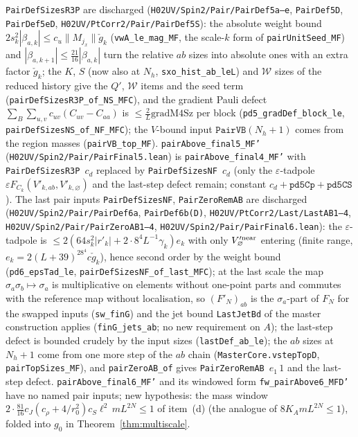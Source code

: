 \documentclass[11pt]{amsart}
\theoremstyle{definition}
\theoremstyle{remark}
\numberwithin{equation}{section}
\begin{document}
\texttt{PairDefSizesR3P} are discharged (\texttt{H02UV/Spin2/Pair/PairDef5a--e}, \texttt{PairDef5D}, \texttt{PairDef5eD}, \texttt{H02UV/PtCorr2/Pair/PairDef5S}): the absolute weight bound $2s_k^2|\beta_{a,k}|\le c_u\|M_{j_x}\|\check g_k$ (\texttt{vwA\_le\_mag\_MF}, the scale-$k$ form of \texttt{pairUnitSeed\_MF}) and $|\beta_{a,k+1}|\le\frac{21}{16}|\beta_{a,k}|$ turn the relative $ab$ sizes into absolute ones with an extra factor $\check g_k$; the $K$, $S$ (now also at $N_h$, \texttt{sxo\_hist\_ab\_leL}) and $\mathcal W$ sizes of the reduced history give the $Q'$, $\mathcal W$ items and the seed term (\texttt{pairDefSizesR3P\_of\_NS\_MFC}), and the gradient Pauli defect $\sum_B\sum_{u,v}c_{uv}(C_{uv}-C_{aa})$ is $\le\frac2L\mathrm{gradM4Sz}$ per block (\texttt{pd5\_gradDef\_block\_le}, \texttt{pairDefSizesNS\_of\_NF\_MFC}); the $V$-bound input $\texttt{PairVB}(N_h+1)$ comes from the region masses (\texttt{pairVB\_top\_MF}). \texttt{pairAbove\_final5\_MF'} (\texttt{H02UV/Spin2/Pair/PairFinal5.lean}) is \texttt{pairAbove\_final4\_MF'} with \texttt{PairDefSizesR3P}~$c_d$ replaced by \texttt{PairDefSizesNF}~$c_d$ (only the $\varepsilon$-tadpole $\varepsilon F_{C_k}(V'_{k,ab},V'_{k,\varnothing})$ and the last-step defect remain; constant $c_d+\texttt{pd5Cp}+\texttt{pd5CS}$). The last pair inputs \texttt{PairDefSizesNF}, \texttt{PairZeroRemAB} are discharged (\texttt{H02UV/Spin2/Pair/PairDef6a}, \texttt{PairDef6b(D)}, \texttt{H02UV/PtCorr2/Last/LastAB1--4}, \texttt{H02UV/Spin2/Pair/PairZeroAB1--4}, \texttt{H02UV/Spin2/Pair/PairFinal6.lean}): the $\varepsilon$-tadpole is $\le2(64s_k^2|r'_k|+2\cdot8^4L^{-1}\gamma_k)e_k$ with only $V'^{\rm near}_\varnothing$ entering (finite range, $e_k=2(L+39)^28^4c\check g_k$), hence second order by the weight bound (\texttt{pd6\_epsTad\_le}, \texttt{pairDefSizesNF\_of\_last\_MFC}); at the last scale the map $\sigma_a\sigma_b\mapsto\sigma_a$ is multiplicative on elements without one-point parts and commutes with the reference map without localisation, so $(F'_N)_{ab}$ is the $\sigma_a$-part of $F_N$ for the swapped inputs (\texttt{sw\_finG}) and the jet bound \texttt{LastJetBd} of the master construction applies (\texttt{finG\_jets\_ab}; no new requirement on $A$); the last-step defect is bounded crudely by the input sizes (\texttt{lastDef\_ab\_le}); the $ab$ sizes at $N_h+1$ come from one more step of the $ab$ chain (\texttt{MasterCore.vstepTopD}, \texttt{pairTopSizes\_MF}), and \texttt{pairZeroAB\_of} gives \texttt{PairZeroRemAB}~$e_1\,1$ and the last-step defect. \texttt{pairAbove\_final6\_MF'} and its windowed form \texttt{fw\_pairAbove6\_MFD'} have no named pair inputs; new hypothesis: the mass window $2\cdot\frac{81}{16}c_J(c_\rho+4/r_0^2)c_S\ell^2\,mL^{2N}\le1$ of item~(d) (the analogue of $8K_AmL^{2N}\le1$), folded into $g_0$ in Theorem~\ref{thm:multiscale}.
\end{document}
